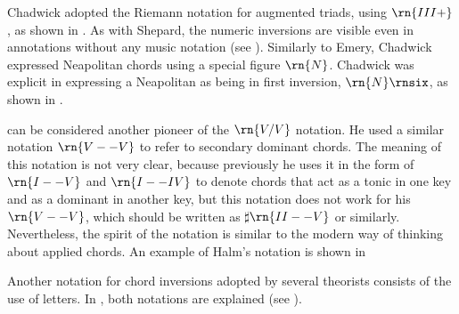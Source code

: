 




Chadwick adopted the Riemann notation for augmented triads,
using $\rn{III+}$, as shown in
. As with
Shepard, the numeric inversions are visible even in
annotations without any music notation (see
). Similarly
to Emery, Chadwick expressed Neapolitan chords using a
special figure $\rn{N}$. Chadwick was explicit in expressing
a Neapolitan as being in first inversion, $\rn{N}\rnsix$, as
shown in .

\textcite{halm1900harmonielehre} can be considered another
pioneer of the $\rn{V/V}$ notation. He used a similar
notation $\rn{V--V}$ to refer to secondary dominant chords.
The meaning of this notation is not very clear, because
previously he uses it in the form of $\rn{I--V}$ and
$\rn{I--IV}$ to denote chords that act as a tonic in one key
and as a dominant in another key, but this notation does not
work for his $\rn{V--V}$, which should be written as
$\sharp{}\rn{II--V}$ or similarly. Nevertheless, the spirit
of the notation is similar to the modern way of thinking
about applied chords. An example of Halm's notation is shown
in


Another notation for chord inversions adopted by several
theorists consists of the use of letters. In
\textcite{cutter1902harmonic}, both notations are explained
(see ).

